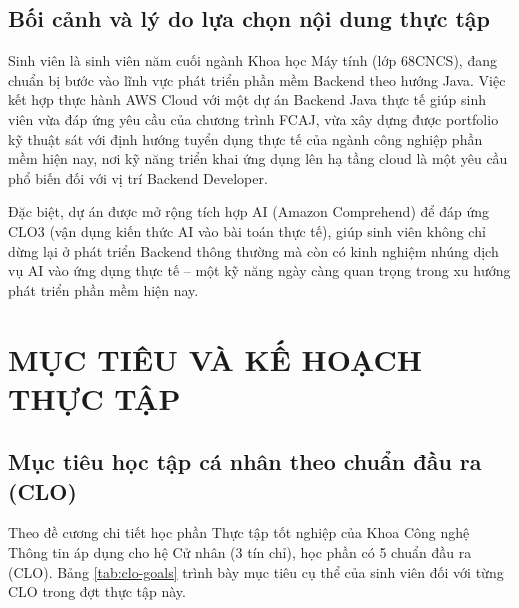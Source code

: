 \documentclass[13pt]{extarticle}
\begin{document}
\subsection{Bối cảnh và lý do lựa chọn nội dung thực tập}

Sinh viên là sinh viên năm cuối ngành Khoa học Máy tính (lớp 68CNCS), đang chuẩn bị bước
vào lĩnh vực phát triển phần mềm Backend theo hướng Java. Việc kết hợp thực
hành AWS Cloud với một dự án Backend Java thực tế giúp sinh viên vừa đáp ứng
yêu cầu của chương trình FCAJ, vừa xây dựng được portfolio kỹ thuật sát với
định hướng tuyển dụng thực tế của ngành công nghiệp phần mềm hiện nay, nơi kỹ
năng triển khai ứng dụng lên hạ tầng cloud là một yêu cầu phổ biến đối với vị
trí Backend Developer.

Đặc biệt, dự án được mở rộng tích hợp AI (Amazon Comprehend) để đáp ứng CLO3
(vận dụng kiến thức AI vào bài toán thực tế), giúp sinh viên không chỉ dừng lại ở
phát triển Backend thông thường mà còn có kinh nghiệm nhúng dịch vụ AI vào ứng dụng
thực tế -- một kỹ năng ngày càng quan trọng trong xu hướng phát triển phần mềm hiện nay.

\newpage

\section{MỤC TIÊU VÀ KẾ HOẠCH THỰC TẬP}

\subsection{Mục tiêu học tập cá nhân theo chuẩn đầu ra (CLO)}

Theo đề cương chi tiết học phần Thực tập tốt nghiệp của Khoa Công nghệ Thông
tin áp dụng cho hệ Cử nhân (3 tín chỉ), học phần có 5 chuẩn đầu ra (CLO).
Bảng \ref{tab:clo-goals} trình bày mục tiêu cụ thể của sinh viên đối với
từng CLO trong đợt thực tập này.
\end{document}
